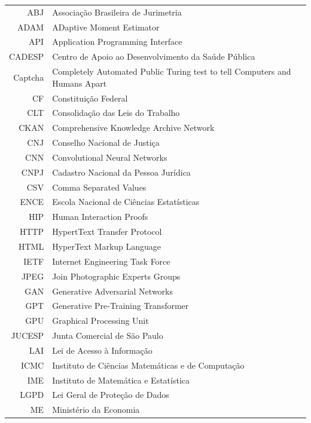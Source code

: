 \documentclass[12pt,twoside,brazilian]{book}
\begin{document}
\begin{tabular}{rl}
   ABJ & Associação Brasileira de Jurimetria\\
   ADAM & ADaptive Moment Estimator\\
   API & Application Programming Interface\\
   CADESP & Centro de Apoio ao Desenvolvimento da Saúde Pública\\
   Captcha & Completely Automated Public Turing test to tell Computers and Humans Apart\\
   CF & Constituição Federal\\
   CLT & Consolidação das Leis do Trabalho\\
   CKAN & Comprehensive Knowledge Archive Network\\
   CNJ & Conselho Nacional de Justiça\\
   CNN & Convolutional Neural Networks\\
   CNPJ & Cadastro Nacional da Pessoa Jurídica\\
   CSV & Comma Separated Values\\
   ENCE & Escola Nacional de Ciências Estatísticas\\
   HIP & Human Interaction Proofs\\
   HTTP & HypertText Transfer Protocol\\
   HTML & HyperText Markup Language\\
   IETF & Internet Engineering Task Force\\
   JPEG & Join Photographic Experts Groups\\
   GAN & Generative Adversarial Networks\\
   GPT & Generative Pre-Training Transformer\\
   GPU & Graphical Processing Unit\\
   JUCESP & Junta Comercial de São Paulo\\
   LAI & Lei de Acesso à Informação\\
   ICMC & Instituto de Ciências Matemáticas e de Computação\\
   IME & Instituto de Matemática e Estatística\\
   LGPD & Lei Geral de Proteção de Dados\\
   ME & Ministério da Economia\\
\end{tabular}
\end{document}
